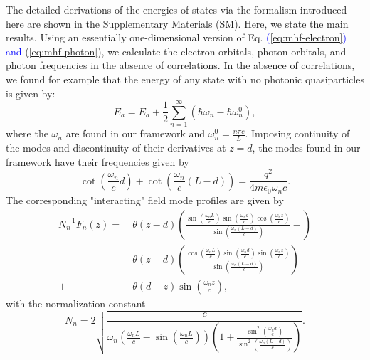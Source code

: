 \documentclass[aps,prl,twocolumn,
	groupedaddress,superscriptaddress,
	amsfonts,amssymb,amsmath,floatfix,
	citeautoscript]{revtex4-1}
\newcommand{\Jadd}[1]{\textcolor{blue}{#1}}
\begin{document}
The detailed derivations of the energies of states via the formalism introduced here are shown in the Supplementary Materials (SM). Here, we state the main results. Using an essentially one-dimensional version of Eq. \Jadd{(\ref{eq:mhf-electron}) and }(\ref{eq:mhf-photon}), we calculate the electron orbitals, photon orbitals, and photon frequencies in the absence of correlations. In the absence of correlations, we found for example that the energy of any state with no photonic quasiparticles is given by:
\begin{equation}
E_a = E_a + \frac{1}{2}\sum\limits_{n=1}^{\infty}(\hbar\omega_n - \hbar\omega_n^0),
\label{eq:casimir}
\end{equation}
where the $\omega_n$ are found in our framework and $\omega_n^0 = \frac{n\pi c}{L}$. Imposing continuity of the modes and discontinuity of their derivatives at $z=d$, the modes found in our framework have their frequencies given by
\begin{equation}
\cot\left(\frac{\omega_n}{c}d \right)+\cot\left(\frac{\omega_n}{c}(L-d) \right) = \frac{q^2}{4m\epsilon_0\omega_nc}.
\label{eq:cot}
\end{equation}
The corresponding "interacting" field mode profiles are given by
\begin{align}\label{eq:field_mode}
N_n^{-1}F_n(z) =~ &\theta(z-d) \left(\frac{\sin\left(\frac{\omega_nL}{c}\right)\sin\left(\frac{\omega_nd}{c}\right)\cos\left(\frac{\omega_nz}{c}\right)}{\sin\left(\frac{\omega_n(L-d)}{c}\right)}-\right) \nonumber \\ 
-&\theta (z-d) \left(\frac{\cos\left(\frac{\omega_nL}{c}\right)\sin\left(\frac{\omega_nd}{c}\right)\sin\left(\frac{\omega_nz}{c}\right)}{\sin\left(\frac{\omega_n(L-d)}{c}\right)}\right) \nonumber \\ 
+&\theta (d-z) \sin\left(\frac{\omega_n z}{c} \right),
\end{align}
with the normalization constant
\begin{equation}\label{eq:mode_normalization}
N_n = 2\sqrt{\frac{c}{\omega_n\left(\frac{\omega_nL}{c}-\sin\left(\frac{\omega_nL}{c}\right) \right)\left(1+\frac{\sin^2\left(\frac{\omega_nd}{c}\right)}{\sin^2\left(\frac{\omega_n(L-d)}{c}\right)} \right)}}.
\end{equation}
\end{document}
